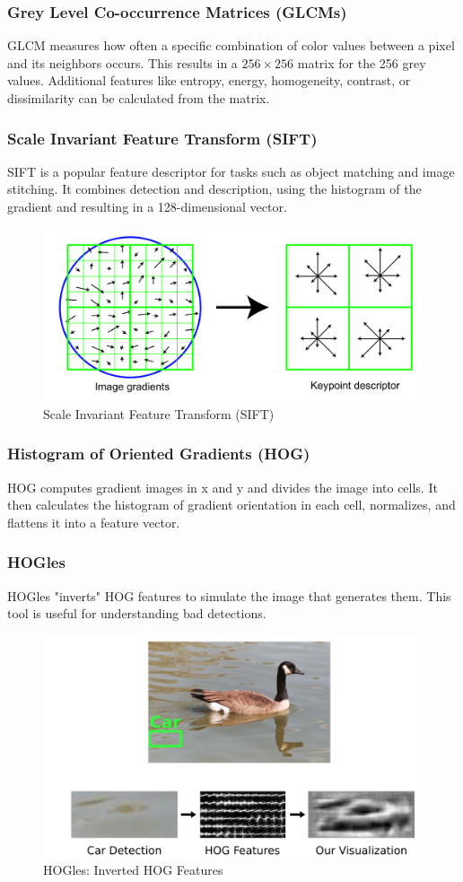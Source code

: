 \subsubsection{Grey Level Co-occurrence Matrices (GLCMs)}

GLCM measures how often a specific combination of color values between a pixel and its neighbors occurs.
This results in a $256\times 256$ matrix for the 256 grey values.
Additional features like entropy, energy, homogeneity, contrast, or dissimilarity can be calculated from the matrix.

\subsubsection{Scale Invariant Feature Transform (SIFT)}

SIFT is a popular feature descriptor for tasks such as object matching and image stitching.
It combines detection and description, using the histogram of the gradient and resulting in a 128-dimensional vector.

\begin{figure}[h]
	\centering
	\includegraphics[width=0.6\linewidth]{img/SIFT}
	\caption{Scale Invariant Feature Transform (SIFT)}
\end{figure}

\subsubsection{Histogram of Oriented Gradients (HOG)}

HOG computes gradient images in x and y and divides the image into cells.
It then calculates the histogram of gradient orientation in each cell, normalizes, and flattens it into a feature vector.

\subsubsection{HOGles}

HOGles "inverts" HOG features to simulate the image that generates them. This tool is useful for understanding bad detections.

\begin{figure}[h]
	\centering
	\includegraphics[width=0.6\linewidth]{img/HOGles}
	\caption{HOGles: Inverted HOG Features}
\end{figure}
